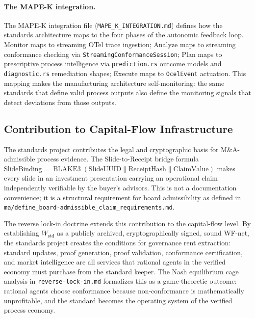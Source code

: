 \paragraph{The MAPE-K integration.}
The MAPE-K integration file (\texttt{MAPE\_K\_INTEGRATION.md}) defines how the standards
architecture maps to the four phases of the autonomic feedback loop. Monitor maps to
streaming OTel trace ingestion; Analyze maps to streaming conformance checking via
\texttt{StreamingConformanceSession}; Plan maps to prescriptive process intelligence via
\texttt{prediction.rs} outcome models and \texttt{diagnostic.rs} remediation shapes;
Execute maps to \texttt{OcelEvent} actuation. This mapping makes the manufacturing
architecture self-monitoring: the same standards that define valid process outputs also
define the monitoring signals that detect deviations from those outputs.

\subsection{Contribution to Capital-Flow Infrastructure}
\label{sec:standards-contribution-capital}

The standards project contributes the legal and cryptographic basis for M\&A-admissible
process evidence. The Slide-to-Receipt bridge formula
$\text{SlideBinding} = \operatorname{BLAKE3}(\text{SlideUUID} \parallel \text{ReceiptHash}
\parallel \text{ClaimValue})$ makes every slide in an investment presentation carrying an
operational claim independently verifiable by the buyer's advisors. This is not a
documentation convenience; it is a structural requirement for board admissibility as
defined in \texttt{ma/define\_board-admissible\_claim\_requirements.md}.

The reverse lock-in doctrine extends this contribution to the capital-flow level. By
establishing $W_{\text{std}}$ as a publicly archived, cryptographically signed, sound WF-net,
the standards project creates the conditions for governance rent extraction: standard
updates, proof generation, proof validation, conformance certification, and market
intelligence are all services that rational agents in the verified economy must purchase
from the standard keeper. The Nash equilibrium cage analysis in \texttt{reverse-lock-in.md}
formalizes this as a game-theoretic outcome: rational agents choose conformance because
non-conformance is mathematically unprofitable, and the standard becomes the operating
system of the verified process economy.
